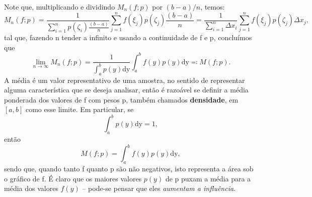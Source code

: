 \documentclass[../distribution_theory_notes.tex]{subfiles}
\begin{document}
         Note que, multiplicando e dividindo \(M_{n}(f; p)\) por \((b-a)/n\), temos: 
           \[
             M_{n}(f; p)=\frac{1}{\sum\limits_{i=1}^{n}p(\zeta_{i})\frac{(b-a)}{n}}\sum\limits_{j=1}^{n}f(\xi_{j})p(\zeta_{j})\frac{(b-a)}{n} = \frac{1}{\sum\limits_{i=1}^{n}\Delta x_{i}}\sum\limits_{j=1}^{n}f(\xi_{j})p(\zeta_{j})\Delta x_{j},
           \]
           tal que, fazendo n tender a infinito e usando a continuidade de f e p, concluímos que 
             \[
               \lim_{n\to \infty}M_{n}(f; p)= \frac{1}{\int_{a}^{b}p(y) \mathrm{dy}}\int_{a}^{b}f(y)p(y) \mathrm{dy} \eqqcolon M(f; p).
             \]
             A média é um valor representativo de uma amostra, no sentido de representar alguma característica que se deseja analisar, então é razoável se definir a média ponderada dos valores de f com pesos p, também chamados \textbf{densidade}, em \([a, b]\) como esse limite. Em particular, se 
               \[
                 \int_{a}^{b}p(y) \mathrm{dy}=1,
               \]
               então 
               \[
                 M(f; p)=\int_{a}^{b}f(y)p(y) \mathrm{dy},
               \]
               sendo que, quando tanto f quanto p são não negativos, isto representa a área sob o gráfico de f. É claro que os maiores valores \(p(y)\) de p puxam a média para a média dos valores \(f(y)\) -- pode-se pensar que eles \textit{aumentam a influência}. 
\end{document}
